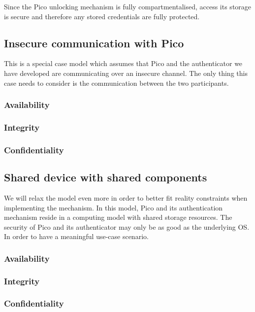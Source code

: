 	Since the Pico unlocking mechanism is fully compartmentalised, access its storage is secure and therefore any stored credentials are fully protected.

\subsection{Insecure communication with Pico}
This is a special case model which assumes that Pico and the authenticator we have developed are communicating over an insecure channel. The only thing this case needs to consider is the communication between the two participants.

	\subsubsection*{Availability}
	\subsubsection*{Integrity}
	\subsubsection*{Confidentiality}

	
\subsection{Shared device with shared components}
We will relax the model even more in order to better fit reality constraints when implementing the mechanism. In this model, Pico and its authentication mechanism reside in a computing model with shared storage resources. The security of Pico and its authenticator may only be as good as the underlying OS. In order to have a meaningful use-case scenario.

	\subsubsection*{Availability}

	\subsubsection*{Integrity}
	\subsubsection*{Confidentiality}

